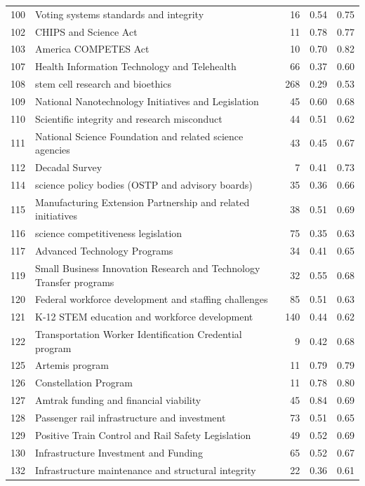 \begin{longtable}{rlrrr}
100 & Voting systems standards and integrity & 16 & 0.54 & 0.75 \\
102 & CHIPS and Science Act & 11 & 0.78 & 0.77 \\
103 & America COMPETES Act & 10 & 0.70 & 0.82 \\
107 & Health Information Technology and Telehealth & 66 & 0.37 & 0.60 \\
108 & stem cell research and bioethics & 268 & 0.29 & 0.53 \\
109 & National Nanotechnology Initiatives and Legislation & 45 & 0.60 & 0.68 \\
110 & Scientific integrity and research misconduct & 44 & 0.51 & 0.62 \\
111 & National Science Foundation and related science agencies & 43 & 0.45 & 0.67 \\
112 & Decadal Survey & 7 & 0.41 & 0.73 \\
114 & science policy bodies (OSTP and advisory boards) & 35 & 0.36 & 0.66 \\
115 & Manufacturing Extension Partnership and related initiatives & 38 & 0.51 & 0.69 \\
116 & science competitiveness legislation & 75 & 0.35 & 0.63 \\
117 & Advanced Technology Programs & 34 & 0.41 & 0.65 \\
119 & Small Business Innovation Research and Technology Transfer programs & 32 & 0.55 & 0.68 \\
120 & Federal workforce development and staffing challenges & 85 & 0.51 & 0.63 \\
121 & K-12 STEM education and workforce development & 140 & 0.44 & 0.62 \\
122 & Transportation Worker Identification Credential program & 9 & 0.42 & 0.68 \\
125 & Artemis program & 11 & 0.79 & 0.79 \\
126 & Constellation Program & 11 & 0.78 & 0.80 \\
127 & Amtrak funding and financial viability & 45 & 0.84 & 0.69 \\
128 & Passenger rail infrastructure and investment & 73 & 0.51 & 0.65 \\
129 & Positive Train Control and Rail Safety Legislation & 49 & 0.52 & 0.69 \\
130 & Infrastructure Investment and Funding & 65 & 0.52 & 0.67 \\
132 & Infrastructure maintenance and structural integrity & 22 & 0.36 & 0.61 \\

\end{longtable}
